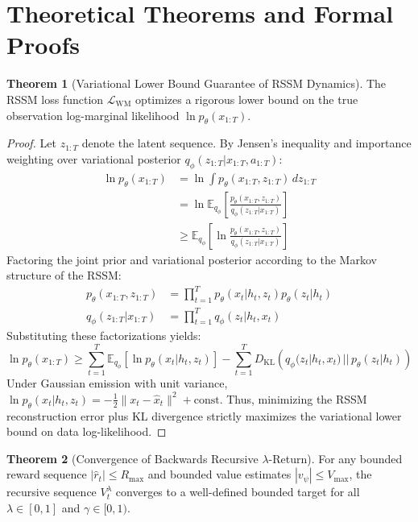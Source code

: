 \documentclass[11pt,a4paper]{article}
\theoremstyle{definition}
\newtheorem{theorem}{\textbf{Theorem}}[section]
\begin{document}
\section{Theoretical Theorems and Formal Proofs}

\begin{theorem}[Variational Lower Bound Guarantee of RSSM Dynamics]
The RSSM loss function $\mathcal{L}_{\text{WM}}$ optimizes a rigorous lower bound on the true observation log-marginal likelihood $\ln p_\theta(x_{1:T})$.
\end{theorem}

\begin{proof}
Let $z_{1:T}$ denote the latent sequence. By Jensen's inequality and importance weighting over variational posterior $q_\phi(z_{1:T} | x_{1:T}, a_{1:T})$:
{\boldmath
\begin{align}
\ln p_\theta(x_{1:T}) &= \ln \int p_\theta(x_{1:T}, z_{1:T}) \, dz_{1:T} \\
&= \ln \mathbb{E}_{q_\phi}\left[ \frac{p_\theta(x_{1:T}, z_{1:T})}{q_\phi(z_{1:T} | x_{1:T})} \right] \\
&\ge \mathbb{E}_{q_\phi}\left[ \ln \frac{p_\theta(x_{1:T}, z_{1:T})}{q_\phi(z_{1:T} | x_{1:T})} \right]
\end{align}
}
Factoring the joint prior and variational posterior according to the Markov structure of the RSSM:
{\boldmath
\begin{align}
p_\theta(x_{1:T}, z_{1:T}) &= \prod_{t=1}^T p_\theta(x_t | h_t, z_t) p_\theta(z_t | h_t) \\
q_\phi(z_{1:T} | x_{1:T}) &= \prod_{t=1}^T q_\phi(z_t | h_t, x_t)
\end{align}
}
Substituting these factorizations yields:
{\boldmath
\begin{equation}
\ln p_\theta(x_{1:T}) \ge \sum_{t=1}^T \mathbb{E}_{q_\phi}\left[ \ln p_\theta(x_t | h_t, z_t) \right] - \sum_{t=1}^T D_{\text{KL}}\left( q_\phi(z_t | h_t, x_t) \,||\, p_\theta(z_t | h_t) \right)
\end{equation}
}
Under Gaussian emission with unit variance, $\ln p_\theta(x_t | h_t, z_t) = -\frac{1}{2}\|x_t - \hat{x}_t\|^2 + \text{const}$.
Thus, minimizing the RSSM reconstruction error plus KL divergence strictly maximizes the variational lower bound on data log-likelihood.
\end{proof}

\begin{theorem}[Convergence of Backwards Recursive $\lambda$-Return]
For any bounded reward sequence $|\hat{r}_t| \le R_{\max}$ and bounded value estimates $|v_\psi| \le V_{\max}$, the recursive sequence $V_t^\lambda$ converges to a well-defined bounded target for all $\lambda \in [0, 1]$ and $\gamma \in [0, 1)$.
\end{theorem}
\end{document}

